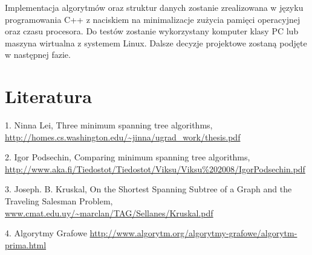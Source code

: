 \documentclass[a4paper, 10pt]{article}
\begin{document}
Implementacja algorytmów oraz struktur danych zostanie zrealizowana w języku programowania C++ z naciskiem na minimalizacje zużycia pamięci operacyjnej oraz czasu procesora. Do testów zostanie wykorzystany komputer klasy PC lub maszyna wirtualna z systemem Linux. Dalsze decyzje projektowe zostaną podjęte w następnej fazie.


\section{Literatura}

1. Ninna Lei, Three minimum spanning tree algorithms, \url{http://homes.cs.washington.edu/~jinna/ugrad_work/thesis.pdf }
 
2.  Igor Podsechin, Comparing minimum spanning tree algorithms, \url{http://www.aka.fi/Tiedostot/Tiedostot/Viksu/Viksu%202008/IgorPodsechin.pdf}

3. Joseph. B. Kruskal, On the Shortest Spanning Subtree of a Graph and the Traveling Salesman Problem, \url{www.cmat.edu.uy/~marclan/TAG/Sellanes/Kruskal.pdf }

4. Algorytmy Grafowe \url{http://www.algorytm.org/algorytmy-grafowe/algorytm-prima.html}
\end{document}
